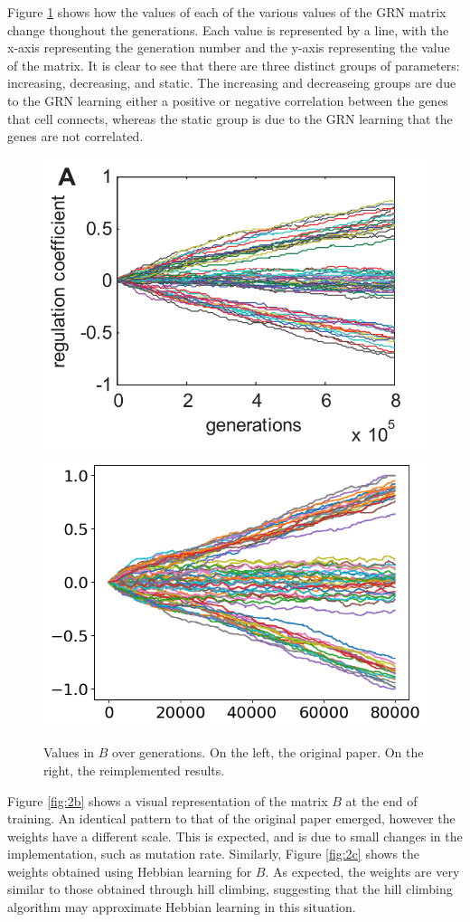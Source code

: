 \documentclass[twocolumn,a4paper,12pt]{article}
\begin{document}
    Figure \ref{fig:2a} shows how the values of each of the various values of the GRN matrix change thoughout the generations. Each value is represented by a line, with the x-axis representing the generation number and the y-axis representing the value of the matrix. It is clear to see that there are three distinct groups of parameters: increasing, decreasing, and static. The increasing and decreaseing groups are due to the GRN learning either a positive or negative correlation between the genes that cell connects, whereas the static group is due to the GRN learning that the genes are not correlated.
    \begin{figure}[h]
        \centering
        \includegraphics[width=0.48\linewidth]{orig_img/fig2a.png}
        \includegraphics[width=0.48\linewidth]{img/fig2a.png}
        \caption{Values in $B$ over generations. On the left, the original paper. On the right, the reimplemented results.} \label{fig:2a}
    \end{figure}

    Figure \ref{fig:2b} shows a visual representation of the matrix $B$ at the end of training. An identical pattern to that of the original paper emerged, however the weights have a different scale. This is expected, and is due to small changes in the implementation, such as mutation rate. Similarly, Figure \ref{fig:2c} shows the weights obtained using Hebbian learning for $B$. As expected, the weights are very similar to those obtained through hill climbing, suggesting that the hill climbing algorithm may approximate Hebbian learning in this situation.
\end{document}
